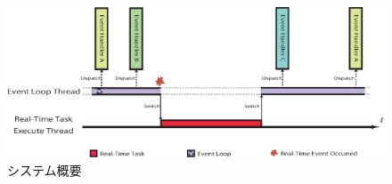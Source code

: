 






\begin{figure}[htbp]
 \begin{center}
  \includegraphics[width=150mm]{./images/system_overview.eps}
 \end{center}
 \caption{システム概要}
 \label{fig:system_overview}
\end{figure}


